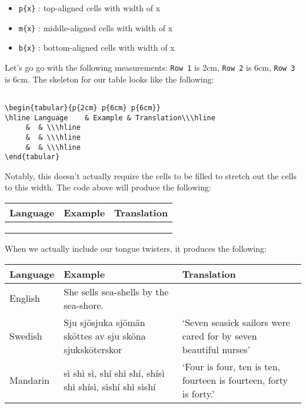 \documentclass[11pt]{article}
\newcommand{\strt}{\noindent{$\bullet$} }
\begin{document}
\begin{itemize}
    \item[] \texttt{p\{x\}} : top-aligned cells with width of x
    \item[] \texttt{m\{x\}} : middle-aligned cells with width of x
    \item[] \texttt{b\{x\}} : bottom-aligned cells with width of x
\end{itemize}

\strt Let's go go with the following measurements: \texttt{Row 1} is 2cm, \texttt{Row 2} is 6cm, \texttt{Row 3} is 6cm.  The skeleton for our table looks like the following:

\bigskip 


\begin{lstlisting}[breaklines]

\begin{tabular}{p{2cm} p{6cm} p{6cm}}
\hline Language    & Example & Translation\\\hline 
     &  & \\\hline 
     &  & \\\hline 
     &  & \\\hline 
\end{tabular}

\end{lstlisting}

\bigskip 

\strt Notably, this doesn't actually require the cells to be filled to stretch out the cells to this width.  The code above will produce the following:

\bigskip 

\begin{table}[H]
    \centering
\begin{tabular}{p{2cm} p{6cm} p{6cm}}
\hline Language    & Example & Translation\\\hline 
     &  & \\\hline 
     &  & \\\hline 
     &  & \\\hline 
\end{tabular}
\end{table}

\bigskip

\strt When we actually include our tongue twisters, it produces the following:

\begin{table}[H]
    \centering
\begin{tabular}{p{2cm} p{6cm} p{6cm}}
    \hline Language & Example & Translation\\\hline 
    English & She sells sea-shells by the sea-shore. & \\\hline
    Swedish & Sju sjösjuka sjömän sköttes av sju sköna sjuksköterskor & `Seven seasick sailors were cared for by seven beautiful nurses'\\\hline 
    Mandarin & sì shì sì, shí shì shí, shísì shì shísì, sìshí shì sìshí & `Four is four, ten is ten, fourteen is fourteen, forty is forty.' \\\hline 
\end{tabular}
\end{table}
\end{document}
